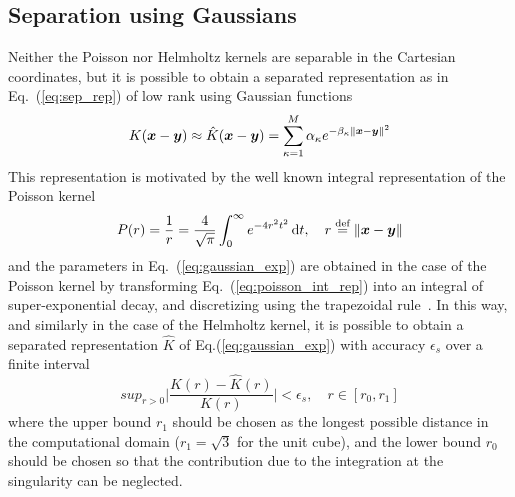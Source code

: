 \subsection{Separation using Gaussians}
Neither the Poisson nor Helmholtz kernels are separable in the Cartesian coordinates, 
but it is possible to obtain a separated representation as in Eq.~(\ref{eq:sep_rep}) 
of low rank using Gaussian functions
\begin{equation}
    \label{eq:gaussian_exp}
    K(\boldsymbol x-\boldsymbol y) \approx \hat{K}(\boldsymbol x-\boldsymbol y) = 
	\sum_{\kappa=1}^M \alpha_\kappa e^{-\beta_\kappa \|\boldsymbol x-\boldsymbol y\|^2}
\end{equation}
This representation is motivated by the well known integral representation of the 
Poisson kernel\cite{Singer:1960}
\begin{equation}
    \label{eq:poisson_int_rep}
    P(r) = \frac{1}{r} = \frac{4}{\sqrt{\pi}}\int_0^\infty e^{-4r^2t^2}\,\mathrm{d} t, 
	\quad r \stackrel{\text{def}}{\hbox{=}} \|\boldsymbol x-\boldsymbol y\|
\end{equation}
and the parameters in Eq.~(\ref{eq:gaussian_exp}) are obtained in the case of the 
Poisson kernel by transforming Eq.~(\ref{eq:poisson_int_rep}) into an integral of 
super-exponential decay, and discretizing using the trapezoidal 
rule~\cite{Harrison:2003,Frediani:2013p1143}. In this way, 
and similarly in the case of the Helmholtz kernel, it is possible to obtain a separated 
representation $\hat{K}$ of Eq.(\ref{eq:gaussian_exp}) with accuracy $\epsilon_s$ over a 
finite interval
\begin{equation}
    sup_{r>0}\Big|\frac{K(r)-\hat{K}(r)}{K(r)}\Big| < \epsilon_s, \quad r\in[r_0,r_1]
\end{equation}
where the upper bound $r_1$ should be chosen as the longest possible distance
in the computational domain ($r_1=\sqrt{3}$ for the unit cube), and the lower
bound $r_0$ should be chosen so that the contribution due to the integration
at the singularity can be neglected\cite{Frediani:2013p1143}.

